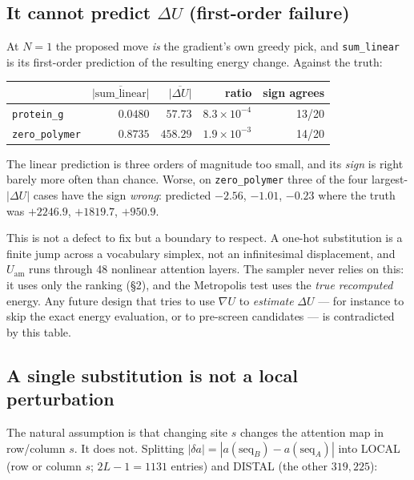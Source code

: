 \documentclass[11pt,a4paper]{article}
\newcommand{\gradU}{\nabla U}
\newcommand{\Uam}{U_{\mathrm{am}}}
\begin{document}
\subsection{It cannot predict \texorpdfstring{$\Delta U$}{dU} (first-order failure)}

At $N=1$ the proposed move \emph{is} the gradient's own greedy pick, and
\texttt{sum\_linear} is its first-order prediction of the resulting energy
change. Against the truth:

\begin{center}
\begin{tabular}{l r r r r}
\toprule
 & $\overline{|\text{sum\_linear}|}$ & $\overline{|\Delta U|}$ & ratio & sign agrees \\
\midrule
\texttt{protein\_g}   & $0.0480$ & $57.73$  & $8.3\times10^{-4}$ & 13/20 \\
\texttt{zero\_polymer}& $0.8735$ & $458.29$ & $1.9\times10^{-3}$ & 14/20 \\
\bottomrule
\end{tabular}
\end{center}

\noindent
The linear prediction is three orders of magnitude too small, and its
\emph{sign} is right barely more often than chance. Worse, on
\texttt{zero\_polymer} three of the four largest-$|\Delta U|$ cases have the
sign \emph{wrong}: predicted $-2.56$, $-1.01$, $-0.23$ where the truth was
$+2246.9$, $+1819.7$, $+950.9$.

This is not a defect to fix but a boundary to respect. A one-hot substitution
is a finite jump across a vocabulary simplex, not an infinitesimal
displacement, and $\Uam$ runs through 48 nonlinear attention layers. The
sampler never relies on this: it uses only the ranking (\S2), and the
Metropolis test uses the \emph{true recomputed} energy. Any future design
that tries to use $\gradU$ to \emph{estimate} $\Delta U$ --- for instance to
skip the exact energy evaluation, or to pre-screen candidates --- is
contradicted by this table.

\subsection{A single substitution is not a local perturbation}

The natural assumption is that changing site $s$ changes the attention map
in row/column $s$. It does not. Splitting
$|\delta a| = |a(\text{seq}_{B}) - a(\text{seq}_{A})|$ into LOCAL (row or
column $s$; $2L-1 = 1131$ entries) and DISTAL (the other $319{,}225$):
\end{document}
